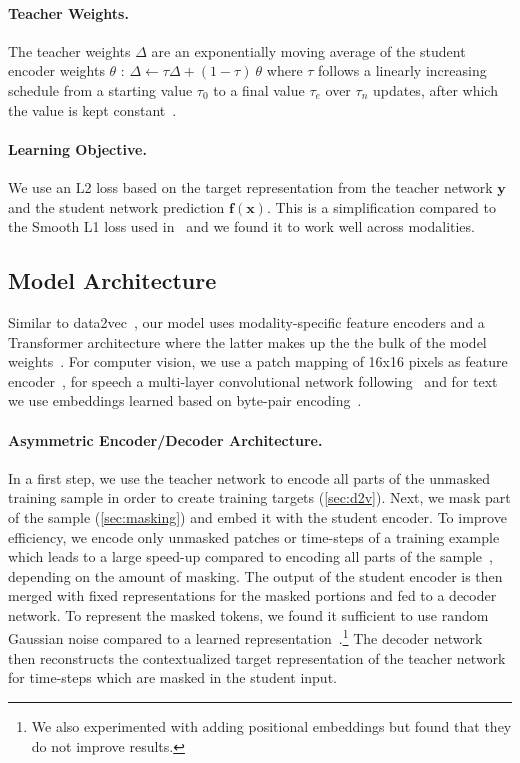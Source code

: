 \documentclass[nohyperref]{article}
\theoremstyle{plain}
\theoremstyle{definition}
\theoremstyle{remark}
\begin{document}
\paragraph{Teacher Weights.}
The teacher weights $\Delta$ are an exponentially moving average of the student encoder weights $\theta$ \citep{grill2020byol}: $\Delta \leftarrow \tau \Delta + (1 - \tau)~\theta$ where $\tau$ follows a linearly increasing schedule from a starting value $\tau_0$ to a final value $\tau_e$ over $\tau_n$ updates, after which the value is kept constant~\citep{baevski2022d2v}.

\paragraph{Learning Objective.}
We use an L2 loss based on the target representation from the teacher network $\mathbf{y}$ and the student network prediction $\mathbf{f(x)}$.
This is a simplification compared to the Smooth L1 loss used in~\citet{baevski2022d2v} and we found it to work well across modalities.




\subsection{Model Architecture}
\label{sec:architecture}

Similar to data2vec~\citep{baevski2022d2v}, our model uses modality-specific feature encoders and a Transformer architecture where the latter makes up the the bulk of the model weights~\citep{vaswani2017transformer}.
For computer vision, we use a patch mapping of 16x16 pixels as feature encoder~\citep{dosovitskiy2020vit}, for speech a multi-layer convolutional network following~\citet{oord2018cpc,baevski2020wav,baevski2022d2v} and for text we use embeddings learned based on byte-pair encoding~\citep{sennrich2016bpe}.


\paragraph{Asymmetric Encoder/Decoder Architecture.}
In a first step, we use the teacher network to encode all parts of the unmasked training sample in order to create training targets (\textsection\ref{sec:d2v}).
Next, we mask part of the sample (\textsection\ref{sec:masking}) and embed it with the student encoder. 
To improve efficiency, we encode only unmasked patches or time-steps of a training example which leads to a large speed-up compared to encoding all parts of the sample~\citep{he2021mae}, depending on the amount of masking.
The output of the student encoder is then merged with fixed representations for the masked portions and fed to a decoder network.
To represent the masked tokens, we found it sufficient to use random Gaussian noise compared to a learned representation~\citep{he2021mae}.\footnote{We also experimented with adding positional embeddings but found that they do not improve results.}
The decoder network then reconstructs the contextualized target representation of the teacher network for time-steps which are masked in the student input.
\end{document}
